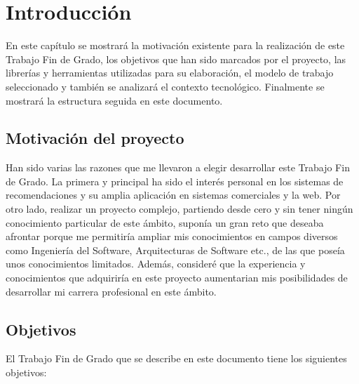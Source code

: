 \chapter{Introducción}

En este capítulo se mostrará la motivación existente para la realización de este Trabajo Fin de Grado, los objetivos que han sido marcados por el proyecto, las librerías y herramientas utilizadas para su elaboración, el modelo de trabajo seleccionado y también se analizará el contexto tecnológico. Finalmente se mostrará la estructura seguida en este documento.

\section{Motivación del proyecto}

Han sido varias las razones que me llevaron a elegir desarrollar este Trabajo Fin de Grado. La primera y principal ha sido el interés personal en los sistemas de recomendaciones y su amplia aplicación en sistemas comerciales y la web. Por otro lado, realizar un proyecto complejo, partiendo desde cero y sin tener ningún conocimiento particular de este ámbito, suponía un gran reto que deseaba afrontar porque me permitiría ampliar mis conocimientos en campos diversos como Ingeniería del Software, Arquitecturas de Software etc., de las que poseía unos conocimientos limitados. Además, consideré que la experiencia y conocimientos que adquiriría en este proyecto aumentarian mis posibilidades de desarrollar mi carrera profesional en este ámbito.

\section{Objetivos}

El Trabajo Fin de Grado que se describe en este documento tiene los siguientes objetivos:

